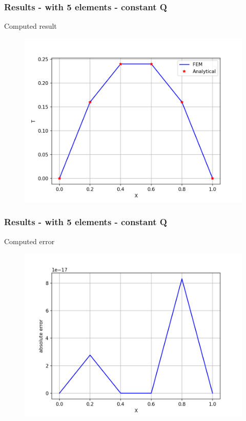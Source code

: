 
\begin{frame}
	\frametitle{Results - with 5 elements - constant Q}
	Computed result
	\begin{figure}
		\includegraphics[scale=0.5]{supportingFiles/results_constantQ/output_5.png}
	\end{figure}
\end{frame}

\begin{frame}
	\frametitle{Results - with 5 elements - constant Q}
	Computed error
	\begin{figure}
		\includegraphics[scale=0.5]{supportingFiles/results_constantQ/error_5.png}
	\end{figure}
\end{frame}

